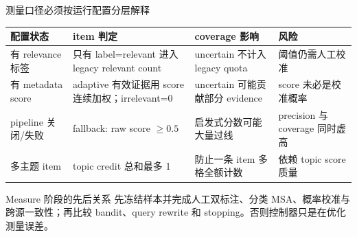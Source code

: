 \begin{frame}{测量口径必须按运行配置分层解释}
\scriptsize
\begin{tabularx}{\textwidth}{p{} p{} X p{}}
\toprule
配置状态 & item 判定 & coverage 影响 & 风险 \\
\midrule
有 relevance 标签 & 只有 label=relevant 进入 legacy relevant count & uncertain 不计入 legacy quota & 阈值仍需人工校准 \\
有 metadata score & adaptive 有效证据用 score 连续加权；irrelevant=0 & uncertain 可能贡献部分 evidence & score 未必是校准概率 \\
pipeline 关闭/失败 & fallback: raw score $\ge 0.5$ & 启发式分数可能大量过线 & precision 与 coverage 同时虚高 \\
多主题 item & topic credit 总和最多 1 & 防止一条 item 多格全额计数 & 依赖 topic score 质量 \\
\bottomrule
\end{tabularx}

\vspace{0.25em}
\begin{block}{Measure 阶段的先后关系}
先冻结样本并完成人工双标注、分类 MSA、概率校准与跨源一致性；再比较 bandit、query rewrite 和 stopping。否则控制器只是在优化测量误差。
\end{block}
\end{frame}
